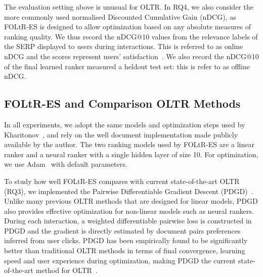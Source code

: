 The evaluation setting above is unusual for OLTR. In RQ4, we also consider the more commonly used normalised Discounted Cumulative Gain (nDCG), as FOLtR-ES is designed to allow optimization based on any absolute measures of ranking quality. We thus record the nDCG@10 values from the relevance labels of the SERP displayed to users during interactions. This is referred to as online nDCG and the scores represent users' satisfaction~\cite{hofmann2013reusing}. We also record the nDCG@10 of the final learned ranker measured a heldout test set: this is refer to as offline nDCG.


\subsection{FOLtR-ES and Comparison OLTR Methods}
In all experiments, we adopt the same models and optimization steps used by Kharitonov~\cite{kharitonov2019federated}, and rely on the well document implementation made publicly available by the author. The two ranking models used by FOLtR-ES are a linear ranker and a neural ranker with a single hidden layer of size 10. For optimization, we use Adam~\cite{kingma2014adam} with default parameters.

To study how well FOLtR-ES compares with current state-of-the-art OLTR (RQ3), we implemented the Pairwise Differentiable Gradient Descent (PDGD)~\cite{oosterhuis2018differentiable}. Unlike many previous OLTR methods that are designed for linear models, PDGD also provides effective optimization for non-linear models such as neural rankers. During each interaction, a weighted differentiable pairwise loss is constructed in PDGD and the gradient is directly estimated by document pairs preferences inferred from user clicks. PDGD has been empirically found to be significantly better than traditional OLTR methods in terms of final convergence, learning speed and user experience during optimization, making PDGD the current state-of-the-art method for OLTR~\cite{oosterhuis2018differentiable,jagerman2019model,zhuang2020counterfactual}.

